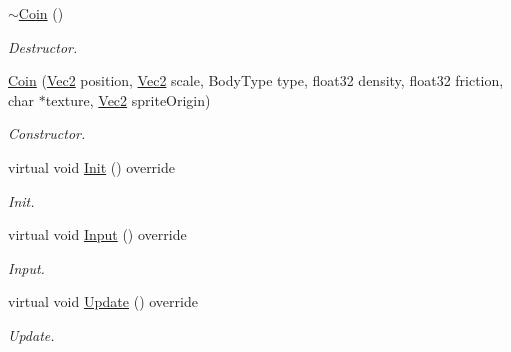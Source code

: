 \begin{DoxyCompactItemize}
\item 
\mbox{\label{class_coin_ad0371a6d98c194a0f6de615206829b16}} 
\hyperlink{class_coin_ad0371a6d98c194a0f6de615206829b16}{$\sim$\+Coin} ()
\begin{DoxyCompactList}\small\item\em Destructor. \end{DoxyCompactList}\item 
\mbox{\label{class_coin_ace98dea331520b1bdd75213da9765b63}} 
\hyperlink{class_coin_ace98dea331520b1bdd75213da9765b63}{Coin} (\hyperlink{struct_vec2}{Vec2} position, \hyperlink{struct_vec2}{Vec2} scale, Body\+Type type, float32 density, float32 friction, char $\ast$texture, \hyperlink{struct_vec2}{Vec2} sprite\+Origin)
\begin{DoxyCompactList}\small\item\em Constructor. \end{DoxyCompactList}\item 
\mbox{\label{class_coin_abe676fdd24be69f9b605a59076d5a90d}} 
virtual void \hyperlink{class_coin_abe676fdd24be69f9b605a59076d5a90d}{Init} () override
\begin{DoxyCompactList}\small\item\em Init. \end{DoxyCompactList}\item 
\mbox{\label{class_coin_a13e1d3025965f73a63e34e9c6a21d8e0}} 
virtual void \hyperlink{class_coin_a13e1d3025965f73a63e34e9c6a21d8e0}{Input} () override
\begin{DoxyCompactList}\small\item\em Input. \end{DoxyCompactList}\item 
\mbox{\label{class_coin_a3638832a26fc17f40d04e8e590cf9963}} 
virtual void \hyperlink{class_coin_a3638832a26fc17f40d04e8e590cf9963}{Update} () override
\begin{DoxyCompactList}\small\item\em Update. \end{DoxyCompactList}\item 
\mbox{\label{class_coin_a4fbc44581a02121f6c4e6b93b493175d}} 

\end{DoxyCompactItemize}
